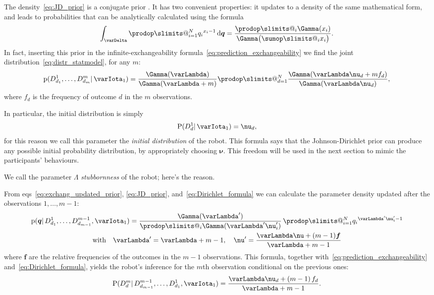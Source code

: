 \documentclass[\ifafour a4paper,12pt,\else a5paper,10pt,\fi%
onecolumn,oneside,article,%
british%
]{memoir}
\makeatletter
\theoremstyle{remark}
\theoremstyle{innote}
\def\sum{\DOTSI\sumop\slimits@}
\def\prod{\DOTSI\prodop\slimits@}
\renewcommand*{\cites}{\parencites}
\newcommand*{\di}{\mathrm{d}}%
\newcommand*{\pf}{\mathrm{p}}%
\newcommand*{\p}{\mathrm{P}}%
\renewcommand*{\|}{\mathpunct{|}}
\newcommand*{\chap}{ch.}%
\newcommand*{\eqns}{eqs}%
\newcommand*{\simpl}{\varDelta}
\newcommand*{\yqq}{q}
\newcommand*{\yq}{\bm{\yqq}}
\newcommand*{\yff}{f}
\newcommand*{\yf}{\bm{\yff}}
\newcommand*{\yI}{\varIota}
\newcommand*{\yMJ}{\yI_1}
\newcommand*{\yN}{\varLambda}
\newcommand*{\ynn}{\nu}
\newcommand*{\yn}{\bm{\nu}}
\makeatother
\begin{document}
The density~\eqref{eq:JD_prior} is a conjugate prior
\cites[\chap~9]{degroot1970_r2004}{diaconisetal1979b}. It has two
convenient properties: it updates to a density of the same mathematical
form, and leads to probabilities that can be analytically calculated using
the formula
\begin{equation}
  \label{eq:Dirichlet_formula}
  \int_{\simpl} \prod_{i=1}^N {\yqq_{i}}^{x_i-1}\,\di\yq = \frac{\prod_i \Gamma(x_i)}{\Gamma\bigl(\sum_i x_i\bigr)}.
\end{equation}
In fact, inserting this prior in the infinite-exchangeability
formula~\eqref{eq:prediction_exchangeability} we find the joint
distribution~\eqref{eq:distr_statmodel}, for any $m$:
\begin{equation}
  \label{eq:joint_distr_JD}
\pf( D^1_{d_1}, \dotsc, D^m_{d_m} \| \yMJ) =
  \frac{\Gamma(\yN)}{\Gamma(\yN+m)}
  \prod_{d=1}^{N}\frac{\Gamma(\yN\ynn_d + m\yff_d)}{\Gamma(\yN\ynn_d)},
\end{equation}
where $\yff_d$ is the frequency of outcome $d$ in the $m$ observations.

In particular, the initial distribution is simply
\begin{equation}
  \label{eq:initial_predictive_JD}
  \p(D^1_{d} \| \yMJ)  = \ynn_d,
\end{equation}
for this reason we call this parameter the \emph{initial distribution} of
the robot. This formula says that the Johnson-Dirichlet prior can produce
any possible initial probability distribution, by appropriately choosing
$\yn$. This freedom will be used in the next section to mimic the
participants' behaviours.

We call the parameter $\yN$ \emph{stubbornness} of the robot; here's the
reason.

From \eqns~\eqref{eq:exchang_updated_prior}, \eqref{eq:JD_prior},
and~\eqref{eq:Dirichlet_formula} we can calculate the parameter density
updated after the observations $1,\dotsc,m-1$:
\begin{multline}
  \label{eq:update_prior_JD}
  \pf(\yq \| D^1_{d_1}, \dotsc, D^{m-1}_{d_{m-1}}, \yMJ)
  = 
  \frac{\Gamma(\yN')}{\prod_i \Gamma(\yN'\ynn_i')}\,
  \prod_{i=1}^{N}{\yqq_i}^{\yN'\ynn_i'-1}
  \\
  \text{with}\quad \yN' =\yN+m-1,\quad
  \yn'=\frac{\yN\yn+(m-1)\yf}{\yN+m-1}
\end{multline}
where $\yf$ are the relative frequencies of the outcomes in the $m-1$
observations. This formula, together
with~\eqref{eq:prediction_exchangeability} and~\eqref{eq:Dirichlet_formula},
yields the robot's inference for the $m$th observation conditional on the
previous ones:
\begin{equation}
  \label{eq:predictive_JD_general}
  \p(D^{m}_{d} \| D^{m-1}_{d_{m-1}},\dotsc,D^1_{d_1}, \yMJ) =
\frac{\yN\ynn_d + (m-1)\,\yff_d}{\yN+m-1}.
\end{equation}
\end{document}
